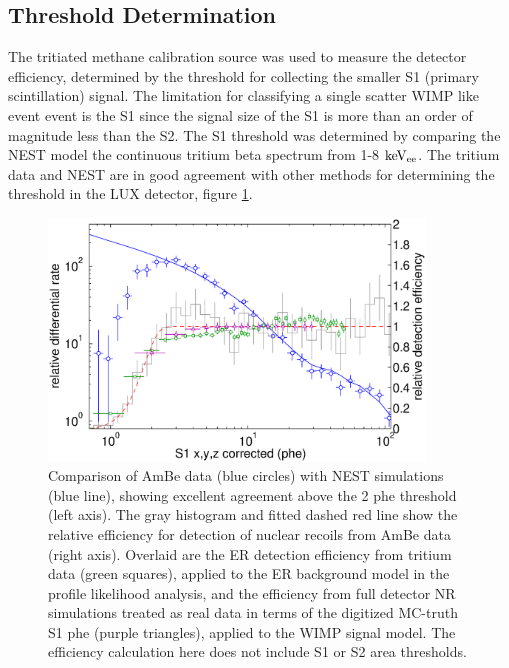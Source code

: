 

\subsection{Threshold Determination}

The tritiated methane calibration source was used to measure the detector efficiency, determined by the threshold for collecting the smaller S1 (primary scintillation) signal. The limitation for classifying a single scatter WIMP like event event is the S1 since the signal size of the S1 is more than an order of magnitude less than the S2. The S1 threshold was determined by comparing the NEST model the continuous tritium beta spectrum from 1-8 $\rm keV_{ee}$. The tritium data and NEST are in good agreement with other methods for determining the threshold in the LUX detector, figure \ref{fig:S1_Thresh}. 


\begin{figure}[h!]\centering
\includegraphics[width=100mm]{Triritium_S1_Threshold_2013_PRL.eps}
\caption{Comparison of AmBe data (blue circles) with NEST simulations (blue line), showing excellent agreement above the 2 phe threshold (left axis). The gray histogram and fitted dashed red line show the relative efficiency for detection of nuclear recoils from AmBe data (right axis). Overlaid are the ER detection efficiency from tritium data (green squares), applied to the ER background model in the profile likelihood analysis, and the efficiency from full detector NR simulations treated as real data in terms of the digitized MC-truth S1 phe (purple triangles), applied to the WIMP signal model. The efficiency calculation here does not include S1 or S2 area thresholds. }
\label{fig:S1_Thresh}
\end{figure}


